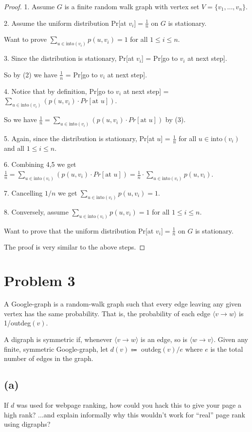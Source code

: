 \documentclass[14pt]{extarticle}
\newcommand{\dps}{\displaystyle}
\begin{document}
\begin{proof}
1. Assume $G$ is a finite random walk graph with vertex set $V = \{v_1, \ldots, v_n\}$.

2. Assume the uniform distribution Pr[at $v_i] = \frac{1}{n}$ on $G$ is stationary. 

Want to prove $\dps\sum_{u \in \text{into}(v_i)} p(u,v_i) = 1$ for all $1 \leq i \leq n$.

3. Since the distribution is stationary, Pr[at $v_i$] = Pr[go to $v_i$ at next step]. 

So by (2) we have $\frac{1}{n}$ = Pr[go to $v_i$ at next step].

4. Notice that by definition, Pr[go to $v_i$ at next step] = $\dps\sum_{u \in \text{into}(v_i)} (p(u,v_i) \cdot Pr[\text{at } u])$. 

So we have $\dps\frac{1}{n} = \sum_{u \in \text{into}(v_i)} (p(u,v_i) \cdot Pr[\text{at } u])$ by (3).

5. Again, since the distribution is stationary, Pr[at $u$] = $\frac{1}{n}$ for all $u \in \text{into}(v_i)$ and all $1 \leq i \leq n$.

6. Combining 4,5 we get $\dps\frac{1}{n} = \sum_{u \in \text{into}(v_i)} (p(u,v_i) \cdot Pr[\text{at } u]) = \frac{1}{n} \cdot\sum_{u \in \text{into}(v_i)} p(u,v_i)$.

7. Cancelling $1/n$ we get $\dps\sum_{u \in \text{into}(v_i)} p(u,v_i) = 1$.

8. Conversely, assume $\dps\sum_{u \in \text{into}(v_i)} p(u,v_i) = 1$ for all $1 \leq i \leq n$. 

Want to prove that the uniform distribution Pr[at $v_i] = \frac{1}{n}$ on $G$ is stationary. 

The proof is very similar to the above steps.
\end{proof}

\section{Problem 3}
A Google-graph is a random-walk graph such that every edge leaving any given vertex has the same proba­bility. That is, the probability of each edge $\langle v \to w \rangle$ is 1/outdeg$(v)$.

A digraph is symmetric if, whenever $\langle v \to w\rangle$ is an edge, so is $\langle w \to v\rangle$. Given any finite, symmetric Google-graph, let $d(v) \Coloneqq$ outdeg$(v) / e$ where $e$ is the total number of edges in the graph.

\subsection{(a)}
If $d$ was used for webpage ranking, how could you hack this to give your page a high rank? ...and explain informally why this wouldn’t work for “real” page rank using digraphs?
\end{document}
